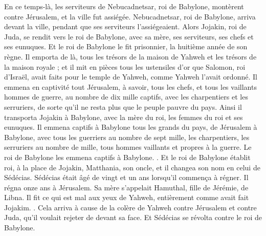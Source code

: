 \begin{multicols}{2}
En ce temps-là, les serviteurs de Nebucadnetsar, roi de Babylone, montèrent contre Jérusalem, et la ville fut assiégée.
Nebucadnetsar, roi de Babylone, arriva devant la ville, pendant que ses serviteurs l'assiégeaient.
Alors Jojakin, roi de Juda, se rendit vers le roi de Babylone, avec sa mère, ses serviteurs, ses chefs et ses eunuques. Et le roi de Babylone le fit prisonnier, la huitième année de son règne.
Il emporta de là, tous les trésors de la maison de Yahweh et les trésors de la maison royale ; et il mit en pièces tous les ustensiles d'or que Salomon, roi d'Israël, avait faits pour le temple de Yahweh, comme Yahweh l'avait ordonné.
Il emmena en captivité tout Jérusalem, à savoir, tous les chefs, et tous les vaillants hommes de guerre, au nombre de dix mille captifs, avec les charpentiers et les serruriers, de sorte qu'il ne resta plus que le peuple pauvre du pays.
Ainsi il transporta Jojakin à Babylone, avec la mère du roi, les femmes du roi et ses eunuques. Il emmena captifs à Babylone tous les grands du pays, de Jérusalem à Babylone,
avec tous les guerriers au nombre de sept mille, les charpentiers, les serruriers au nombre de mille, tous hommes vaillants et propres à la guerre. Le roi de Babylone les emmena captifs à Babylone.
.
Et le roi de Babylone établit roi, à la place de Jojakin, Matthania, son oncle, et il changea son nom en celui de Sédécias.
Sédécias était âgé de vingt et un ans lorsqu'il commença à régner. Il régna onze ans à Jérusalem. Sa mère s'appelait Hamuthal, fille de Jérémie, de Libna.
Il fit ce qui est mal aux yeux de Yahweh, entièrement comme avait fait Jojakim.
.
Cela arriva à cause de la colère de Yahweh contre Jérusalem et contre Juda, qu'il voulait rejeter de devant sa face. Et Sédécias se révolta contre le roi de Babylone.

\end{multicols}
